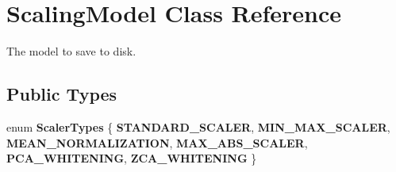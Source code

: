 \section{Scaling\+Model Class Reference}
\label{classmlpack_1_1data_1_1ScalingModel}


The model to save to disk.  


\subsection*{Public Types}
\begin{DoxyCompactItemize}
\item 
enum \textbf{ Scaler\+Types} \{ \newline
\textbf{ S\+T\+A\+N\+D\+A\+R\+D\+\_\+\+S\+C\+A\+L\+ER}, 
\newline
\textbf{ M\+I\+N\+\_\+\+M\+A\+X\+\_\+\+S\+C\+A\+L\+ER}, 
\newline
\textbf{ M\+E\+A\+N\+\_\+\+N\+O\+R\+M\+A\+L\+I\+Z\+A\+T\+I\+ON}, 
\newline
\textbf{ M\+A\+X\+\_\+\+A\+B\+S\+\_\+\+S\+C\+A\+L\+ER}, 
\newline
\textbf{ P\+C\+A\+\_\+\+W\+H\+I\+T\+E\+N\+I\+NG}, 
\newline
\textbf{ Z\+C\+A\+\_\+\+W\+H\+I\+T\+E\+N\+I\+NG}
 \}
\end{DoxyCompactItemize}
